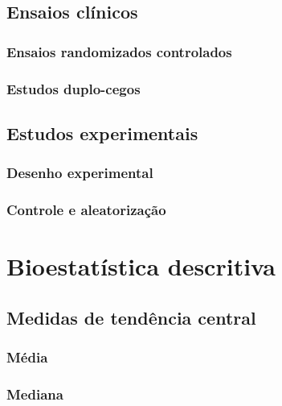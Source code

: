 \documentclass[
]{book}
\begin{document}
\section{Ensaios clínicos}\label{ensaios-cluxednicos}

\subsection{Ensaios randomizados controlados}\label{ensaios-randomizados-controlados}

\subsection{Estudos duplo-cegos}\label{estudos-duplo-cegos}

\section{Estudos experimentais}\label{estudos-experimentais}

\subsection{Desenho experimental}\label{desenho-experimental}

\subsection{Controle e aleatorização}\label{controle-e-aleatorizauxe7uxe3o}

\chapter{Bioestatística descritiva}\label{bioestatuxedstica-descritiva}

\section{Medidas de tendência central}\label{medidas-de-tenduxeancia-central}

\subsection{Média}\label{muxe9dia}

\subsection{Mediana}\label{mediana}
\end{document}
